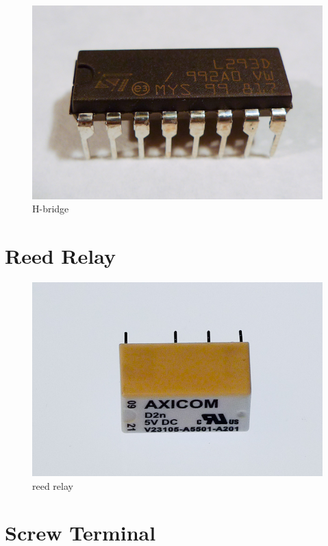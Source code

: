 \begin{figure}[!htb]
     \centering
     \includegraphics[scale=0.3]{img/components/h_bridge.jpg}
     \caption{H-bridge}
     \label{H-bridge}
\end{figure}


\section{Reed Relay}

\begin{figure}[!htb]
     \centering
     \includegraphics[scale=0.3]{img/components/relay.jpg}
     \caption{reed relay}
     \label{reed relay}
\end{figure}

\section{Screw Terminal}

